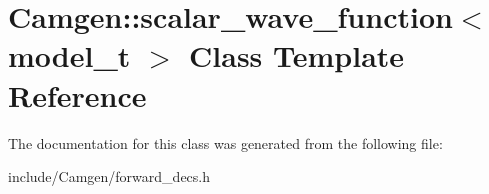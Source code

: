 \hypertarget{a00488}{\section{Camgen\-:\-:scalar\-\_\-wave\-\_\-function$<$ model\-\_\-t $>$ Class Template Reference}
\label{a00488}
}


The documentation for this class was generated from the following file\-:\begin{DoxyCompactItemize}
\item 
include/\-Camgen/forward\-\_\-decs.\-h\end{DoxyCompactItemize}
